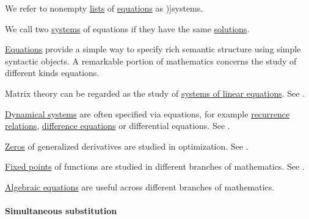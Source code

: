 \begin{definition}\label{def:system_of_equations}\mimprovised
  We refer to nonempty \hyperref[def:ordered_tuple]{lists} of \hyperref[def:equation]{equations} as \term[en=equation system (\cite[\S 5.4.1]{Mimram2020ProgramEqualsProof})]{systems}.
\end{definition}

\begin{concept}\label{con:equivalent_systems_of_equations}
  We call two \hyperref[def:system_of_equations]{systems} of equations  if they have the same \hyperref[con:equation_solution]{solutions}.
\end{concept}

\begin{example}\label{ex:def:equation}
  \hyperref[def:equation]{Equations} provide a simple way to specify rich semantic structure using simple syntactic objects. A remarkable portion of mathematics concerns the study of different kinds equations.

  \begin{thmenum}
     Matrix theory can be regarded as the study of \hyperref[def:system_of_linear_equations]{systems of linear equations}. See .

     \hyperref[def:dynamical_system]{Dynamical systems} are often specified via equations, for example \hyperref[def:recurrence_relation]{recurrence relations}, \hyperref[def:difference_equation]{difference equations} or differential equations. See .

     \hyperref[def:zero_of_function]{Zeros} of generalized derivatives are studied in optimization. See .

     \hyperref[def:function_fixed_point]{Fixed points} of functions are studied in different branches of mathematics. See .

     \hyperref[def:polynomial_equation]{Algebraic equations} are useful across different branches of mathematics.
  \end{thmenum}
\end{example}

\paragraph{Simultaneous substitution}

